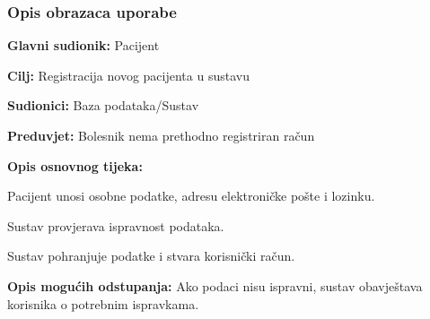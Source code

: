 \subsubsection{Opis obrazaca uporabe}


\noindent {}
\begin{packed_item}
	
	\item \textbf{Glavni sudionik: }Pacijent
	\item  \textbf{Cilj:} Registracija novog pacijenta u sustavu
	\item  \textbf{Sudionici:} Baza podataka/Sustav
	\item  \textbf{Preduvjet:} Bolesnik nema prethodno registriran račun
	\item  \textbf{Opis osnovnog tijeka:}
	
	\item[] \begin{packed_enum}
		
		\item Pacijent unosi osobne podatke, adresu elektroničke pošte i lozinku.
		\item Sustav provjerava ispravnost podataka.
		\item Sustav pohranjuje podatke i stvara korisnički račun.
		
	\end{packed_enum}
	
	\item  \textbf{Opis mogućih odstupanja:} Ako podaci nisu ispravni, sustav obavještava korisnika o potrebnim ispravkama.
	
	
\end{packed_item}

